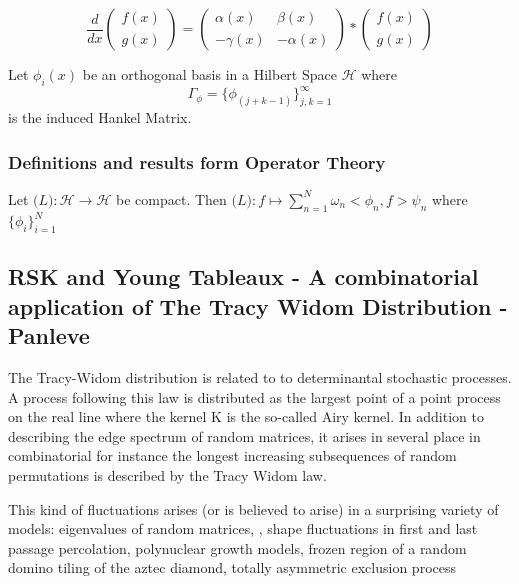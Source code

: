\begin{equation*}
\frac{d}{dx}\left( \begin{array}{c}
        f(x) \\
        g(x)
      \end{array}
\right) = \left(
      \begin{array}{cc}
        \alpha(x) & \beta(x) \\
        -\gamma(x) & -\alpha(x)
      \end{array}
\right) * \left( \begin{array}{c}
        f(x) \\
        g(x)
      \end{array} \right)
\end{equation*}

Let $\phi_i(x)$ be an orthogonal basis in a Hilbert Space $\mathcal{H}$ where
\begin{equation*}
\Gamma_{\phi}
= \{\phi_(j+k-1)\}_{j,k=1}^{\infty}
\end{equation*}
is the induced Hankel Matrix.

\subsubsection{Definitions and results form Operator Theory}
Let $\mathcal(L) : \mathcal{H} \rightarrow \mathcal{H}$ be compact.  Then $\mathcal(L): f \mapsto \sum\limits_{n=1}^{N} \omega_n <\phi_n, f> \psi_n$ where $\{\phi_i\}_{i=1}^{N}$

\subsection{RSK and Young Tableaux - A combinatorial application of The Tracy Widom Distribution - Panleve}
The Tracy-Widom distribution is related to to determinantal stochastic processes.  A process following this law is distributed as the largest point of a point process on the real line where the kernel K is the so-called Airy kernel.  In addition to describing the edge spectrum of random matrices, it arises in several place in combinatorial for instance the longest increasing subsequences of random permutations is described by the Tracy Widom law.

 This kind of fluctuations arises (or is believed to arise) in a surprising variety of models: eigenvalues of random matrices, , shape fluctuations in first and last passage percolation, polynuclear growth models, frozen region of a random domino tiling of the aztec diamond, totally asymmetric exclusion process

